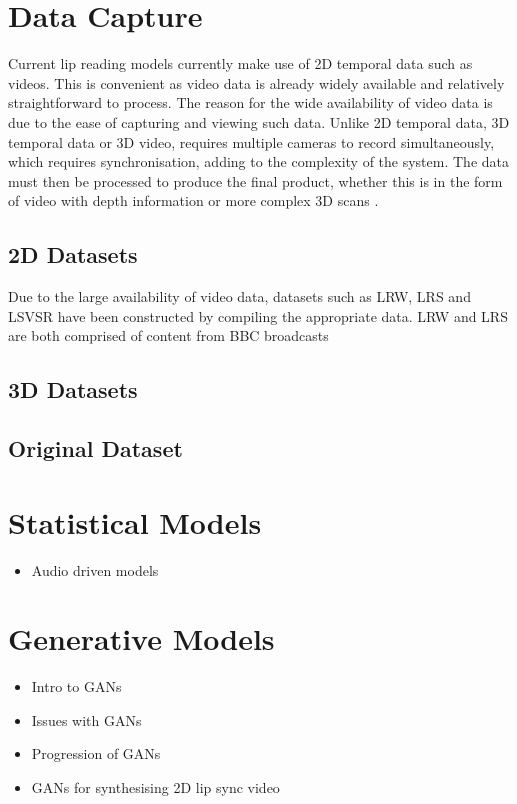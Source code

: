 \documentclass[12pt]{report}
\begin{document}
\section{Data Capture}
Current lip reading models currently make use of 2D temporal data such as videos.
This is convenient as video data is already widely available and relatively straightforward to process.
The reason for the wide availability of video data is due to the ease of capturing and viewing such data.
Unlike 2D temporal data, 3D temporal data or 3D video, requires multiple cameras to record simultaneously, which requires synchronisation, adding to the complexity of the system.
The data must then be processed to produce the final product, whether this is in the form of video with depth information or more complex 3D scans \cite{Li2017}.

\subsection{2D Datasets}
Due to the large availability of video data, datasets such as LRW, LRS and LSVSR have been constructed by compiling the appropriate data.
LRW and LRS are both comprised of content from BBC broadcasts \cite{Chung2016, Chung2017}

\subsection{3D Datasets}

\subsection{Original Dataset}

\section{Statistical Models}
\begin{itemize}
    \item Audio driven models
\end{itemize}

\section{Generative Models}
\begin{itemize}
    \item Intro to GANs
    \item Issues with GANs
    \item Progression of GANs
    \item GANs for synthesising 2D lip sync video
\end{itemize}
\end{document}
